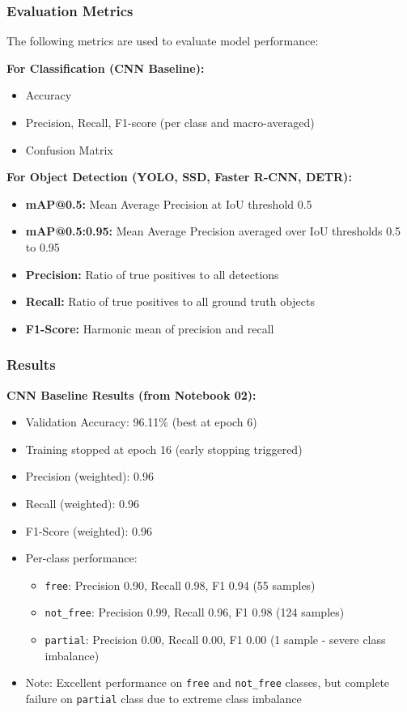 \documentclass[12pt,a4paper]{article}
\begin{document}
\subsubsection{Evaluation Metrics}

The following metrics are used to evaluate model performance:

\textbf{For Classification (CNN Baseline):}
\begin{itemize}
    \item Accuracy
    \item Precision, Recall, F1-score (per class and macro-averaged)
    \item Confusion Matrix
\end{itemize}

\textbf{For Object Detection (YOLO, SSD, Faster R-CNN, DETR):}
\begin{itemize}
    \item \textbf{mAP@0.5:} Mean Average Precision at IoU threshold 0.5
    \item \textbf{mAP@0.5:0.95:} Mean Average Precision averaged over IoU thresholds 0.5 to 0.95
    \item \textbf{Precision:} Ratio of true positives to all detections
    \item \textbf{Recall:} Ratio of true positives to all ground truth objects
    \item \textbf{F1-Score:} Harmonic mean of precision and recall
\end{itemize}

\subsubsection{Results}

\textbf{CNN Baseline Results (from Notebook 02):}
\begin{itemize}
    \item Validation Accuracy: 96.11\% (best at epoch 6)
    \item Training stopped at epoch 16 (early stopping triggered)
    \item Precision (weighted): 0.96
    \item Recall (weighted): 0.96
    \item F1-Score (weighted): 0.96
    \item Per-class performance:
    \begin{itemize}
        \item \texttt{free}: Precision 0.90, Recall 0.98, F1 0.94 (55 samples)
        \item \texttt{not\_free}: Precision 0.99, Recall 0.96, F1 0.98 (124 samples)
        \item \texttt{partial}: Precision 0.00, Recall 0.00, F1 0.00 (1 sample - severe class imbalance)
    \end{itemize}
    \item Note: Excellent performance on \texttt{free} and \texttt{not\_free} classes, but complete failure on \texttt{partial} class due to extreme class imbalance
\end{itemize}
\end{document}
